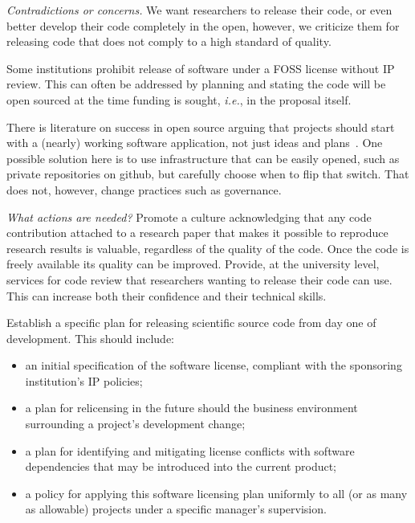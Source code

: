\documentclass[a4paper,UKenglish]{dagman}
\newcommand{\ie}{\emph{i.e.},\xspace}
\begin{document}
\emph{Contradictions or concerns.}
We want researchers to release their code, or even better develop their code completely in the open, however, we criticize them for releasing code that does not comply to a high standard of quality.

Some institutions prohibit release of software under a FOSS license without IP review. This can often be addressed by planning and stating the code will be open sourced at the time funding is sought, \ie in the proposal itself.

There is literature on success in open source arguing that projects should start with a (nearly) working software application, not just ideas and plans~\cite{senyard2004have}. One possible solution here is to use infrastructure that can be easily opened, such as private repositories on github, but carefully choose when to flip that switch. That does not, however, change practices such as governance.



\emph{What actions are needed?}
Promote a culture acknowledging that any code contribution attached to a research paper that makes it possible to reproduce research results is valuable, regardless of the quality of the code. Once the code is freely available its quality can be improved.
Provide, at the university level, services for code review that researchers wanting to release their code can use. This can increase both their confidence and their technical skills.


Establish a specific plan for releasing scientific source code from day one of development. This should include:
\begin{itemize}
\item an initial specification of the software license, compliant with the sponsoring institution's IP policies;
\item a plan for relicensing in the future should the business environment surrounding a project's development change;
\item a plan for identifying and mitigating license conflicts with software dependencies that may be introduced into the current product;
\item a policy for applying this software licensing plan uniformly to all (or as many as allowable) projects under a specific manager's supervision.
\end{itemize}
\end{document}
